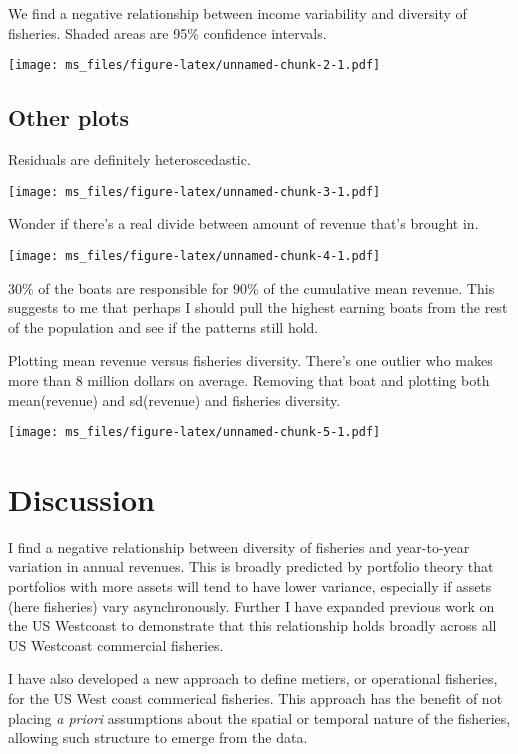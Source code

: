 \documentclass[]{article}
\begin{document}
We find a negative relationship between income variability and diversity
of fisheries. Shaded areas are 95\% confidence intervals.

\texttt{[image: ms\_files/figure-latex/unnamed-chunk-2-1.pdf]}

\subsection{Other plots}\label{other-plots}

Residuals are definitely heteroscedastic.

\texttt{[image: ms\_files/figure-latex/unnamed-chunk-3-1.pdf]}

Wonder if there's a real divide between amount of revenue that's brought
in.

\texttt{[image: ms\_files/figure-latex/unnamed-chunk-4-1.pdf]}

30\% of the boats are responsible for 90\% of the cumulative mean
revenue. This suggests to me that perhaps I should pull the highest
earning boats from the rest of the population and see if the patterns
still hold.

Plotting mean revenue versus fisheries diversity. There's one outlier
who makes more than 8 million dollars on average. Removing that boat and
plotting both mean(revenue) and sd(revenue) and fisheries diversity.

\texttt{[image: ms\_files/figure-latex/unnamed-chunk-5-1.pdf]}

\section{Discussion}\label{discussion}

I find a negative relationship between diversity of fisheries and
year-to-year variation in annual revenues. This is broadly predicted by
portfolio theory that portfolios with more assets will tend to have
lower variance, especially if assets (here fisheries) vary
asynchronously. Further I have expanded previous work on the US
Westcoast to demonstrate that this relationship holds broadly across all
US Westcoast commercial fisheries.

I have also developed a new approach to define metiers, or operational
fisheries, for the US West coast commerical fisheries. This approach has
the benefit of not placing \emph{a priori} assumptions about the spatial
or temporal nature of the fisheries, allowing such structure to emerge
from the data.
\end{document}

